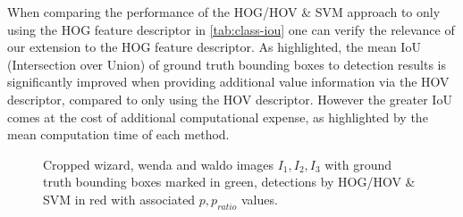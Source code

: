 \documentclass[11pt]{article}
\begin{document}
When comparing the performance of the HOG/HOV \& SVM approach to only using the HOG feature descriptor in \autoref{tab:class-iou}
one can verify the relevance of our extension to the HOG feature descriptor. As highlighted, the mean IoU (Intersection over Union)
of ground truth bounding boxes to detection results is significantly improved when providing additional value information via the HOV descriptor,
compared to only using the HOV descriptor.
However the greater IoU comes at the cost of additional computational expense, as highlighted by the mean computation time of each method.


\begin{figure}
    \centering
    \begin{subfigure}{0.3\linewidth}
    \end{subfigure}
    \begin{subfigure}{0.3\linewidth}
    \end{subfigure}
    \begin{subfigure}{0.3\linewidth}
    \end{subfigure}
    \caption{Cropped wizard, wenda and waldo images \( I_1, I_2, I_3 \) with ground truth bounding boxes marked in green,
    detections by HOG/HOV \& SVM in red with associated \( p, p_{ratio} \) values.}
    \label{fig:detections}
\end{figure}
\end{document}
